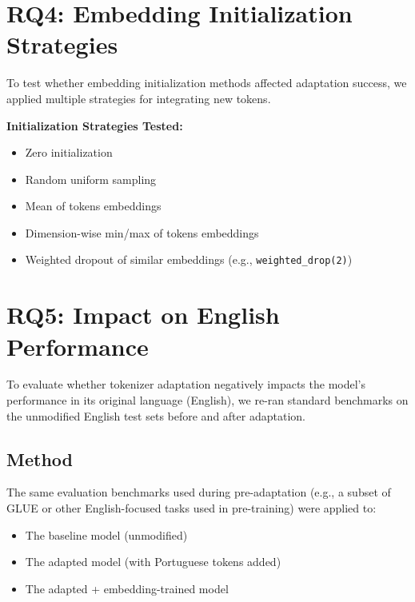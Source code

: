 
\section{RQ4: Embedding Initialization Strategies}
\label{sec:init_strategies}

To test whether embedding initialization methods affected adaptation success, we applied multiple strategies for integrating new tokens.

\textbf{Initialization Strategies Tested:}
\begin{itemize}
    \item Zero initialization
    \item Random uniform sampling
    \item Mean of tokens embeddings
    \item Dimension-wise min/max of tokens embeddings
    \item Weighted dropout of similar embeddings (e.g., \texttt{weighted\_drop(2)})
\end{itemize}




\section{RQ5: Impact on English Performance}
\label{sec:english_regression}

To evaluate whether tokenizer adaptation negatively impacts the model’s performance in its original language (English), we re-ran standard benchmarks on the unmodified English test sets before and after adaptation.

\subsection*{\textbf{Method}}

The same evaluation benchmarks used during pre-adaptation (e.g., a subset of GLUE or other English-focused tasks used in pre-training) were applied to:
\begin{itemize}
    \item The baseline model (unmodified)
    \item The adapted model (with Portuguese tokens added)
    \item The adapted + embedding-trained model
\end{itemize}

